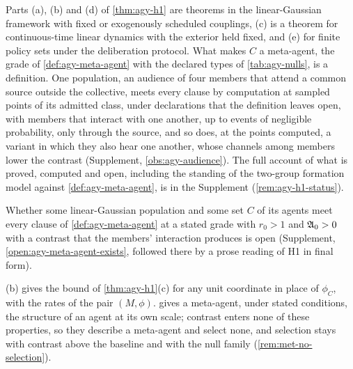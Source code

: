 Parts (a), (b) and (d) of \cref{thm:agy-h1} are theorems in the linear-Gaussian framework with fixed or exogenously scheduled couplings, (c) is a theorem for continuous-time linear dynamics with the exterior held fixed, and (e) for finite policy sets under the deliberation protocol. What makes $C$ a meta-agent, the grade of \cref{def:agy-meta-agent} with the declared types of \cref{tab:agy-nulls}, is a definition. One population, an audience of four members that attend a common source outside the collective, meets every clause by computation at sampled points of its admitted class, under declarations that the definition leaves open, with members that interact with one another, up to events of negligible probability, only through the source, and so does, at the points computed, a variant in which they also hear one another, whose channels among members lower the contrast (Supplement, \cref{obs:agy-audience}). The full account of what is proved, computed and open, including the standing of the two-group formation model against \cref{def:agy-meta-agent}, is in the Supplement (\cref{rem:agy-h1-status}).

Whether some linear-Gaussian population and some set $C$ of its agents meet every clause of \cref{def:agy-meta-agent} at a stated grade with $r_0>1$ and $\mathfrak{A}_0>0$ with a contrast that the members' interaction produces is open (Supplement, \cref{open:agy-meta-agent-exists}, followed there by a prose reading of H1 in final form).

(b) gives the bound of \cref{thm:agy-h1}(c) for any unit coordinate in place of $\phi_C$, with the rates of the pair $(M,\phi)$.  gives a meta-agent, under stated conditions, the structure of an agent at its own scale; contrast enters none of these properties, so they describe a meta-agent and select none, and selection stays with contrast above the baseline and with the null family (\cref{rem:met-no-selection}).
